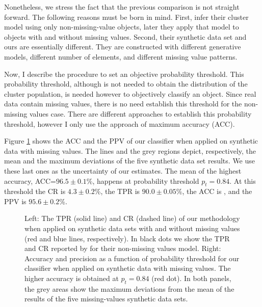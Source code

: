 Nonetheless, we stress the fact that the previous comparison is not straight forward. The following reasons must be born in mind. First, \citet{Sarro2014} infer their cluster model using only non-missing-value objects, later they apply that model to objects with and without missing values. Second, their synthetic data set and ours are essentially different. They are constructed with different generative models, different number of elements, and different missing value patterns. 

Now, I describe the procedure to set an objective probability threshold. This probability threshold, although is not needed to obtain the distribution of the cluster population, is needed however to objectively classify an object. Since real data contain missing values, there is no need establish this threshold for the non-missing values case. There are different approaches to establish this probability threshold, however I only use the approach of maximum accuracy (ACC). 

Figure \ref{fig:tfpr} shows the ACC and the PPV of our classifier when applied on synthetic data with missing values. The lines and the grey regions depict, respectively, the mean and the maximum deviations of the five synthetic data set results. We use these last ones as the uncertainty of our estimates. The mean of the highest accuracy, ACC=$96.5\pm0.1$\%, happens at probability threshold $p_t = 0.84$. At this threshold the CR is $4.3\pm0.2$\%, the TPR is $90.0\pm0.05$\%, the ACC is , and the PPV is $95.6\pm0.2$\%. 

\begin{figure}[!htp]
\begin{center}
\caption{Left: The TPR (solid line) and CR (dashed line) of our methodology  when applied on synthetic data sets with and without missing values (red and blue lines, respectively). In black dots we show the TPR and CR reported by \citet{Sarro2014} for their non-missing values model. Right: Accuracy and precision as a function of probability threshold for our classifier when applied on synthetic data with missing values. The higher accuracy is obtained at $p_t=0.84$ (red dot). In both panels, the grey areas show the maximum deviations from the mean of the results of the five missing-values synthetic data sets.}
\label{fig:tfpr}
\end{center}
\end{figure}

